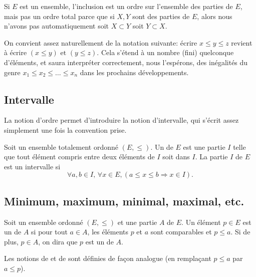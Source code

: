 \begin{example}  \label{ExeooOrdreInclusion}
	Si \( E\) est un ensemble, l'inclusion est un ordre sur l'ensemble des parties de \( E\), mais pas un ordre total parce que si \( X,Y\) sont des parties de \( E\), alors nous n'avons pas automatiquement soit \( X\subset Y\) soit \( Y\subset X\).
\end{example}

\begin{normaltext}\label{NORMooIntroIntervalleOrdonne}
	On convient assez naturellement de la notation suivante: écrire \( x \leq y \leq z \) revient à écrire \( (x \leq y)\text{ et } (y \leq z) \). Cela s'étend à un nombre (fini) quelconque d'éléments, et  saura interpréter correctement, nous l'espérons, des inégalités du genre \( x_1 \leq x_2 \leq \dots \leq x_n \) dans les prochains développements.
\end{normaltext}




\subsection{Intervalle}


La notion d'ordre permet d'introduire la notion d'intervalle, qui s'écrit assez simplement une fois la convention prise.

\begin{definition}  \label{DefEYAooMYYTz}
	Soit un ensemble totalement ordonné \( (E,\leq)\). Un  de \( E\) est une partie \( I\) telle que tout élément compris entre deux éléments de \( I \) soit dans \( I \). La partie \( I \) de \( E\) est un intervalle si
	\[
		\forall a,b\in I,\, \forall x \in E, (a\leq x\leq b \Rightarrow x\in I).
	\]
\end{definition}

\subsection{Minimum, maximum, minimal, maximal, etc.}


\begin{definition}      \label{DEFooDNWRooTiMAzK}
	Soit un ensemble ordonné \( (E,\leq)\) et une partie \( A\) de \( E\). Un élément \( p\in E\) est un  de \( A\) si pour tout \( a\in A\), les éléments \( p\) et \( a\) sont comparables et \( p\leq a\). Si de plus, \( p \in A \), on dira que \( p \) est un  de \( A\).

	Les notions de  et de  sont définies de façon analogue (en remplaçant \( p\leq a\) par \( a\leq p\)).
\end{definition}


